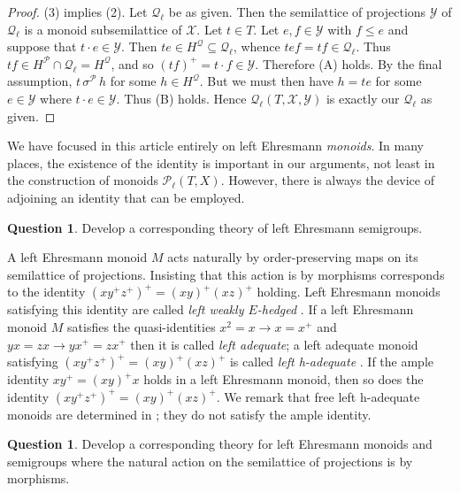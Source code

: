 \documentclass[12pt]{amsart}
\theoremstyle{definition}
\newtheorem{question}[them]{Question}
\theoremstyle{definition}
\numberwithin{them}{section}
\numberwithin{equation}{section}
\newcommand{\QQ}{\mbox{$\mathcal{Q}_\ell$}}
\newcommand{\X}{\mathcal{X}}
\newcommand{\Y}{\mathcal{Y}}
\begin{document}
{{\begin{proof}
(3) implies (2). Let $\QQ$ be as given. Then the semilattice of projections $\mathcal{Y}$ of $\QQ$ is a monoid subsemilattice of $\X$.
Let $t\in T$. Let $e,f\in \Y$ with $f\leq e$ and suppose that 
$ t\cdot e\in \Y$.  Then $te\in H^{\mathcal{Q}}\subseteq \QQ$, whence  $tef=tf\in \QQ$. Thus $tf\in H^{\mathcal{P}}\cap \QQ=H^{\mathcal{Q}}$, and so $(tf)^+=t\cdot f\in \Y$. Therefore (A) holds. By  the final assumption, $t\, \sigma^{\mathcal{P}}\, h$ for some $h\in H^{\mathcal{Q}}$.
But we must then have $h=te$ for some $e\in\Y$ where $t\cdot e\in \Y$. Thus (B) holds. Hence $\QQ(T,\X,\Y)$ is exactly our $\QQ$ as given.
\end{proof}


We have focused in this article entirely on left Ehresmann {\em monoids}. In many places, the existence of the identity is important in our arguments, not least in the construction of monoids $\mathcal{P}_\ell(T,X)$. However, there is always the device of adjoining an identity that can be employed.

\begin{question}\label{qn:semigroups} Develop a corresponding theory of left Ehresmann semigroups.
\end{question}

A left Ehresmann monoid $M$ acts naturally by order-preserving maps on its semilattice of projections. Insisting that this action is by morphisms corresponds to the identity $(xy^+z^+)^+=(xy)^+(xz)^+$ holding. Left Ehresmann monoids satisfying this identity are called {\em left weakly $E$-hedged} \cite{FGG2}.  If a left Ehresmann monoid $M$ satisfies the quasi-identities
$x^2=x\rightarrow x=x^+$ and $yx=zx\rightarrow yx^+=zx^+$ then it is called {\em left adequate}; a left adequate monoid satisfying
$(xy^+z^+)^+=(xy)^+(xz)^+$ is  called {\em left h-adequate} \cite{F4}.  If the ample identity $xy^+=(xy)^+x$ holds in a left Ehresmann monoid,   then  so does the identity $(xy^+z^+)^+=(xy)^+(xz)^+$. We remark that 
free left h-adequate monoids are determined in \cite{F4}; they do not satisfy the ample identity. 



\begin{question}\label{qn:hsemigroups} Develop a corresponding theory for left Ehresmann monoids and semigroups where the natural action on the semilattice of projections is by morphisms.
\end{question}





}}
\end{document}
